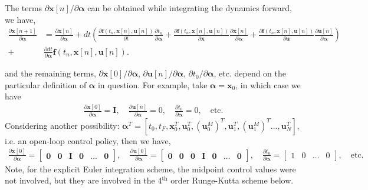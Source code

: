 \documentclass[onecolumn,11pt]{article}
\newcommand{\bs}{\boldsymbol}
\begin{document}
The terms $\partial \bs x[n]/\partial \bs \alpha$ can be obtained while integrating the dynamics forward, we have, 
\begin{equation}
\begin{split}
\frac{\partial \bs x[n+1]}{\partial \bs \alpha} &= \frac{\partial \bs x[n]}{\partial \bs \alpha} + {d t} \left( \frac{\partial \bs f(t_n,\bs x[n], \bs u[n])}{\partial t}\frac{\partial t_n}{\partial \bs \alpha} + \frac{\partial \bs f(t_n,\bs x[n], \bs u[n])}{\partial \bs x}\frac{\partial \bs x[n]}{\partial \bs \alpha}  + \frac{\partial \bs f(t_n,\bs x[n], \bs u[n])}{\partial \bs u}\frac{\partial \bs u [n]}{\partial \bs \alpha}\right)  \\
+ & \frac{\partial dt}{\partial \bs \alpha}  \bs f(t_n,\bs x[n],\bs u[n]).
\end{split}
\label{eq:dxda}
\end{equation}

and the remaining terms, $\partial \bs x[0] /\partial\bs \alpha $, $\partial \bs u[n]/\partial \bs \alpha$, $\partial t_0 / \partial \bs \alpha$, etc. depend on the particular definition of $\bs \alpha$ in question. For example, take $\bs \alpha = \bs x_0$, in which case we have
\begin{align*}
\frac{\partial \bs x[0]}{\partial \bs \alpha} = \bs I, \quad  \frac{\partial \bs u[n]}{\partial \bs \alpha} = 0, \quad 
\frac{\partial t_0}{\partial \bs \alpha} =0, \quad \text{etc.}
\end{align*} 
Considering another possibility: $\bs \alpha^T = [t_0, t_F, \bs x_0^T, \bs u_0^T, (\bs u^M_0)^T, \bs u_1^T, (\bs u^M_1)^T ... , \bs u_N^T ]$, i.e. an open-loop control policy, then we have, 
\begin{align*}
\frac{\partial \bs x[0]}{\partial \bs \alpha} = 
\begin{bmatrix}
\bs 0 & \bs 0 & \bs I & \bs 0 & \dots & \bs 0
\end{bmatrix}, \quad  
\frac{\partial \bs u[0]}{\partial \bs \alpha} = 
\begin{bmatrix}
\bs 0 & \bs 0 & \bs 0 & \bs I & \bs 0 & \dots & \bs 0
\end{bmatrix}, \quad 
\frac{\partial t_0}{\partial \bs \alpha} =
\begin{bmatrix}
1 & 0 & \dots & 0 
\end{bmatrix}
, \quad \text{etc.}
\end{align*} 
Note, for the explicit Euler integration scheme, the midpoint control values were not involved, but they are involved in the 4$^{\text{th}}$ order Runge-Kutta scheme below.
\end{document}
